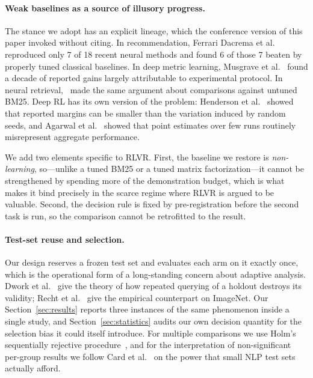 \paragraph{Weak baselines as a source of illusory progress.}
The stance we adopt has an explicit lineage, which the conference version of
this paper invoked without citing. In recommendation, Ferrari Dacrema et
al.~\cite{dacrema2019} reproduced only 7 of 18 recent neural methods and found
6 of those 7 beaten by properly tuned classical baselines. In deep metric
learning, Musgrave et al.~\cite{musgrave2020} found a decade of reported gains
largely attributable to experimental protocol. In neural
retrieval,~\cite{lin2018hype} made the same argument about comparisons against
untuned BM25. Deep RL has its own version of the problem: Henderson et
al.~\cite{henderson2018matters} showed that reported margins can be smaller
than the variation induced by random seeds, and Agarwal et
al.~\cite{agarwal2021precipice} showed that point estimates over few runs
routinely misrepresent aggregate performance.

We add two elements specific to RLVR. First, the baseline we restore is
\emph{non-learning}, so---unlike a tuned BM25 or a tuned matrix
factorization---it cannot be strengthened by spending more of the demonstration
budget, which is what makes it bind precisely in the scarce regime where RLVR
is argued to be valuable. Second, the decision rule is fixed by
pre-registration before the second task is run, so the comparison cannot be
retrofitted to the result.

\paragraph{Test-set reuse and selection.}
Our design reserves a frozen test set and evaluates each arm on it exactly
once, which is the operational form of a long-standing concern about adaptive
analysis. Dwork et al.~\cite{dwork2015holdout} give the theory of how repeated
querying of a holdout destroys its validity; Recht et
al.~\cite{recht2019} give the empirical counterpart on ImageNet. Our
Section~\ref{sec:results} reports three instances of the same phenomenon inside
a single study, and Section~\ref{sec:statistics} audits our own decision
quantity for the selection bias it could itself introduce. For multiple
comparisons we use Holm's sequentially rejective procedure~\cite{holm1979},
and for the interpretation of non-significant per-group results we follow
Card et al.~\cite{card2020power} on the power that small NLP test sets actually
afford.

